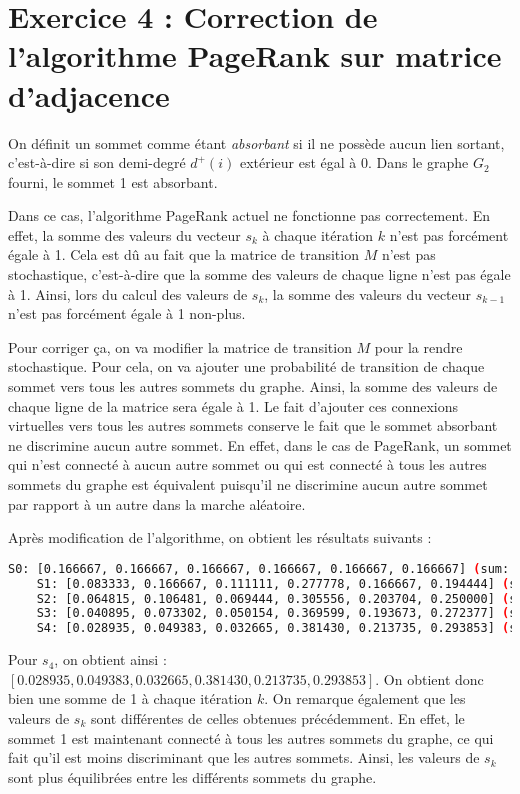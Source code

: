 \section{Exercice 4 : Correction de l'algorithme PageRank sur matrice d'adjacence}
On définit un sommet comme étant \textit{absorbant} si il ne possède aucun lien sortant, c'est-à-dire si son demi-degré $d^+(i)$ extérieur est égal à 0. Dans le graphe $G_2$ fourni, le sommet 1 est absorbant.

Dans ce cas, l'algorithme PageRank actuel ne fonctionne pas correctement. En effet, la somme des valeurs du vecteur $s_k$ à chaque itération $k$ n'est pas forcément égale à 1. Cela est dû au fait que la matrice de transition $M$ n'est pas stochastique, c'est-à-dire que la somme des valeurs de chaque ligne n'est pas égale à 1. Ainsi, lors du calcul des valeurs de $s_k$, la somme des valeurs du vecteur $s_{k-1}$ n'est pas forcément égale à 1 non-plus.

Pour corriger ça, on va modifier la matrice de transition $M$ pour la rendre stochastique. Pour cela, on va ajouter une probabilité de transition de chaque sommet vers tous les autres sommets du graphe. Ainsi, la somme des valeurs de chaque ligne de la matrice sera égale à 1. Le fait d'ajouter ces connexions virtuelles vers tous les autres sommets conserve le fait que le sommet absorbant ne discrimine aucun autre sommet. En effet, dans le cas de PageRank, un sommet qui n'est connecté à aucun autre sommet ou qui est connecté à tous les autres sommets du graphe est équivalent puisqu'il ne discrimine aucun autre sommet par rapport à un autre dans la marche aléatoire.

Après modification de l'algorithme, on obtient les résultats suivants :

\begin{minipage}{\dimexpr\linewidth-20pt}
    \begin{lstlisting}[language=bash, caption={Résultat de l'algorithme PageRank sur le graphe $G_2$ fourni, pour $k = 4$, avec la somme des valeurs du vecteur $s_k$ à chaque itération $k$.}]
    S0: [0.166667, 0.166667, 0.166667, 0.166667, 0.166667, 0.166667] (sum: 1.000000)
    S1: [0.083333, 0.166667, 0.111111, 0.277778, 0.166667, 0.194444] (sum: 1.000000)
    S2: [0.064815, 0.106481, 0.069444, 0.305556, 0.203704, 0.250000] (sum: 1.000000)
    S3: [0.040895, 0.073302, 0.050154, 0.369599, 0.193673, 0.272377] (sum: 1.000000)
    S4: [0.028935, 0.049383, 0.032665, 0.381430, 0.213735, 0.293853] (sum: 1.000000)
    \end{lstlisting}
\end{minipage}

Pour $s_4$, on obtient ainsi : $[0.028935, 0.049383, 0.032665, 0.381430, 0.213735, 0.293853]$. On obtient donc bien une somme de 1 à chaque itération $k$. On remarque également que les valeurs de $s_k$ sont différentes de celles obtenues précédemment. En effet, le sommet 1 est maintenant connecté à tous les autres sommets du graphe, ce qui fait qu'il est moins discriminant que les autres sommets. Ainsi, les valeurs de $s_k$ sont plus équilibrées entre les différents sommets du graphe.